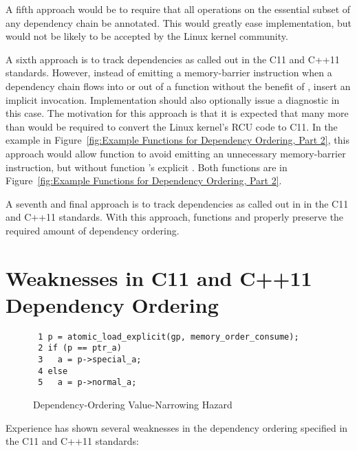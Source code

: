 \documentclass[letterpaper,twocolumn,10pt]{article}
\begin{document}
A fifth approach would be to require that all operations on the
essential subset of any dependency chain be annotated.
This would greatly ease implementation, but would not be likely
to be accepted by the Linux kernel community.

A sixth approach is to track dependencies as called out in the
C11 and C++11 standards.
However, instead of emitting a memory-barrier
instruction when a dependency chain flows into or out of a function
without the benefit of , insert an
implicit  invocation.
Implementation should also optionally issue a diagnostic in this case.
The motivation for this approach is that it is expected that many
more  than  would
be required to convert the Linux kernel's RCU code to C11.
In the example in
Figure~\ref{fig:Example Functions for Dependency Ordering, Part 2},
this approach would allow function  to avoid emitting an
unnecessary memory-barrier instruction, but without function 's
explicit .
Both functions are in
Figure~\ref{fig:Example Functions for Dependency Ordering, Part 2}.

A seventh and final approach is to track dependencies as called out in
in the C11 and C++11 standards.
With this approach, functions  and  properly
preserve the required amount of dependency ordering.

\section{Weaknesses in C11 and C++11 Dependency Ordering}
\label{sec:Weaknesses in C11 and C++11 Dependency Ordering}

\begin{figure}[tbp]
{ \scriptsize
\begin{verbatim}
 1 p = atomic_load_explicit(gp, memory_order_consume);
 2 if (p == ptr_a)
 3   a = p->special_a;
 4 else
 5   a = p->normal_a;
\end{verbatim}
}
\caption{Dependency-Ordering Value-Narrowing Hazard}
\label{fig:Dependency-Ordering Value-Narrowing Hazard}
\end{figure}

Experience has shown several weaknesses in the dependency ordering
specified in the C11 and C++11 standards:
\end{document}

